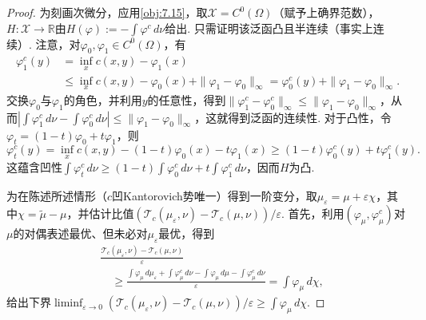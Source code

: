 \begin{proof}
为刻画次微分，应用\autoref{obj:7.15}，取$\mathscr X=C^0(\Omega)$（赋予上确界范数），$H:\mathscr X\to\mathbb R$由$H(\varphi):=-\int\varphi^c\,d\nu$给出. 只需证明该泛函凸且半连续（事实上连续）. 注意，对$\varphi_0,\varphi_1\in C^0(\Omega)$，有
\[
\begin{aligned}
 \varphi_1^c(y)&=\inf_x c(x,y)-\varphi_1(x)\\
 &\leq\inf_x c(x,y)-\varphi_0(x)+\|\varphi_1-\varphi_0\|_\infty
 =\varphi_0^c(y)+\|\varphi_1-\varphi_0\|_\infty.
\end{aligned}
\]
交换$\varphi_0$与$\varphi_1$的角色，并利用$y$的任意性，得到$\|\varphi_1^c-\varphi_0^c\|_\infty\leq\|\varphi_1-\varphi_0\|_\infty$，从而$|\int\varphi_1^c\,d\nu-\int\varphi_0^c\,d\nu|\leq\|\varphi_1-\varphi_0\|_\infty$，这就得到泛函的连续性. 对于凸性，令$\varphi_t=(1-t)\varphi_0+t\varphi_1$，则
\[
 \varphi_t^c(y)=\inf_x c(x,y)-(1-t)\varphi_0(x)-t\varphi_1(x)
       \geq(1-t)\varphi_0^c(y)+t\varphi_1^c(y).
\]
这蕴含凹性$\int\varphi_t^c\,d\nu\geq(1-t)\int\varphi_0^c\,d\nu+t\int\varphi_1^c\,d\nu$，因而$H$为凸.

为在陈述所述情形（$c$凹Kantorovich势唯一）得到一阶变分，取$\mu_\varepsilon=\mu+\varepsilon\chi$，其中$\chi=\widetilde\mu-\mu$，并估计比值$(\mathscr T_c(\mu_\varepsilon,\nu)-\mathscr T_c(\mu,\nu))/\varepsilon$. 首先，利用$(\varphi_\mu,\varphi_\mu^c)$对$\mu$的对偶表述最优、但未必对$\mu_\varepsilon$最优，得到
\[
\begin{aligned}
 &\frac{\mathscr T_c(\mu_\varepsilon,\nu)-\mathscr T_c(\mu,\nu)}\varepsilon\\
 &\quad\geq\frac{\int\varphi_\mu\,d\mu_\varepsilon+\int\varphi_\mu^c\,d\nu
                  -\int\varphi_\mu\,d\mu-\int\varphi_\mu^c\,d\nu}\varepsilon
 =\int\varphi_\mu\,d\chi,
\end{aligned}
\]
给出下界$\liminf_{\varepsilon\to0}(\mathscr T_c(\mu_\varepsilon,\nu)-\mathscr T_c(\mu,\nu))/\varepsilon\geq\int\varphi_\mu\,d\chi$.


\end{proof}
